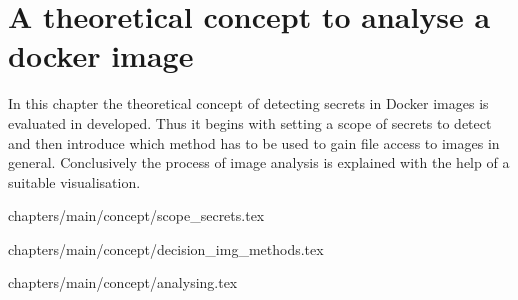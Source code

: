 \chapter{A theoretical concept to analyse a docker image}
\label{ch:theory}
In this chapter the theoretical concept of detecting secrets in Docker images is evaluated in developed. Thus it begins with setting a scope of secrets to detect and then introduce which method has to be used to gain file access to images in general. Conclusively the process of image analysis is explained with the help of a suitable visualisation.

 {chapters/main/concept/scope_secrets.tex}

 {chapters/main/concept/decision_img_methods.tex}

 {chapters/main/concept/analysing.tex}
